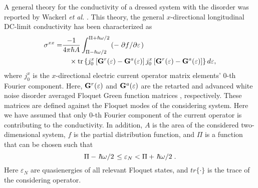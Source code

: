 
A general theory for the conductivity of a dressed system with the disorder was reported by Wackerl \textit{et al.} \cite{wackerl20,wackerlthesis20}. This theory, the general $x$-directional longitudinal DC-limit conductivity has been characterized as
\begin{equation} \label{eq:22}
  \begin{aligned}
    \sigma^{xx} = &
    \frac{-1}{4\pi\hbar A}
    \int_{\Pi-\hbar\omega/2}^{\Pi+ \hbar\omega/2}
    \left(
    -\pdv*{f}{\varepsilon }\right) \\
    &  \quad\times
    \tr
    \left\{
    {j}^x_0
    \left[
    \vb{G}^{r} (\varepsilon) - \vb{G}^{a} (\varepsilon)
    \right]
    {j}^x_0
    \left[
    \vb{G}^{r} (\varepsilon) - \vb{G}^{a} (\varepsilon)
    \right]
    \right\} d\varepsilon,
  \end{aligned}
\end{equation}
where $j^x_0$ is the $x$-directional electric current operator matrix elements' $0$-th Fourier component. Here, $\vb{G}^{r}(\varepsilon)$ and $\vb{G}^{a} (\varepsilon)$ are the retarted and advanced white noise disorder averaged Floquet Green function matrices \cite{wackerl20,wackerlthesis20}, respectively. These matrices are defined against the Floquet modes of the considering system. Here we have assumed that only $0$-th Fourier component of the current operator is contributing to the conductivity. In addition, $A$ is the area of the considered two-dimensional system, $f$ is the partial distribution function, and $\Pi$ is a function that can be chosen such that
\begin{equation} \label{eq:23}
    \Pi- \flatfrac{\hbar \omega}{2}
    \leq \varepsilon_N
    <
    \Pi + \flatfrac{\hbar \omega}{2}.
\end{equation}
Here $ \varepsilon_N$ are quasienergies of all relevant Floquet states, and $tr\{\cdot\}$ is the trace of the considering operator.

